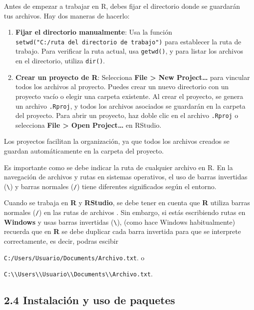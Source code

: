 \documentclass[
  letterpaper,
  DIV=11,
  numbers=noendperiod]{scrreprt}
\begin{document}
Antes de empezar a trabajar en R, debes fijar el directorio donde se
guardarán tus archivos. Hay dos maneras de hacerlo:

\begin{enumerate}
\def\labelenumi{\arabic{enumi}.}
\item
  \textbf{Fijar el directorio manualmente}: Usa la función
  \texttt{setwd("C:/ruta\ del\ directorio\ de\ trabajo")} para
  establecer la ruta de trabajo. Para verificar la ruta actual, usa
  \texttt{getwd()}, y para listar los archivos en el directorio, utiliza
  \texttt{dir()}.
\item
  \textbf{Crear un proyecto de R}: Selecciona \textbf{File
  \textgreater{} New Project\ldots{}} para vincular todos los archivos
  al proyecto. Puedes crear un nuevo directorio con un proyecto vacío o
  elegir una carpeta existente. Al crear el proyecto, se genera un
  archivo \texttt{.Rproj}, y todos los archivos asociados se guardarán
  en la carpeta del proyecto. Para abrir un proyecto, haz doble clic en
  el archivo \texttt{.Rproj} o selecciona \textbf{File \textgreater{}
  Open Project\ldots{}} en RStudio.
\end{enumerate}

Los proyectos facilitan la organización, ya que todos los archivos
creados se guardan automáticamente en la carpeta del proyecto.

Es importante como se debe indicar la ruta de cualquier archivo en R. En
la navegación de archivos y rutas en sistemas operativos, el uso de
barras invertidas (\texttt{\textbackslash{}}) y barras normales
(\texttt{/}) tiene diferentes significados según el entorno.

Cuando se trabaja en \textbf{R} y \textbf{RStudio}, se debe tener en
cuenta que \textbf{R} utiliza barras normales (\texttt{/}) en las rutas
de archivos . Sin embargo, si estás escribiendo rutas en
\textbf{Windows} y usas barras invertidas (\texttt{\textbackslash{}}),
(como hace Windows habitualmente) recuerda que en \textbf{R} se debe
duplicar cada barra invertida para que se interprete correctamente, es
decir, podras escibir

\texttt{C:/Users/Usuario/Documents/Archivo.txt}. o

\texttt{C:\textbackslash{}\textbackslash{}Users\textbackslash{}\textbackslash{}Usuario\textbackslash{}\textbackslash{}Documents\textbackslash{}\textbackslash{}Archivo.txt}.

\hypertarget{instalaciuxf3n-y-uso-de-paquetes}{%
\subsection{2.4 Instalación y uso de
paquetes}\label{instalaciuxf3n-y-uso-de-paquetes}}
\end{document}
